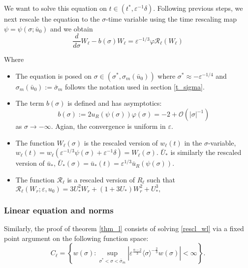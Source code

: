 \documentclass[letterpaper,11pt]{article}
\newcommand{\Ral}{\mathcal{R}}
\newcommand{\rmO}{\mathcal{O}}
\newcommand{\eps}{\varepsilon}
\numberwithin{equation}{section}
\theoremstyle{plain}
\begin{document}
We want to solve this equation on $t\in (t^*, \eps^{-1}\delta)$. 
Following previous steps, we next rescale the equation to the $\sigma$-time variable using the time rescaling map $\psi = \psi(\sigma; \bar{u}_0)$ and we obtain
\begin{equation}\label{rescl_wl}
\frac{d}{d\sigma} W_\ell - b(\sigma)W_\ell = \eps^{-1/3}\varphi \Ral_\ell(W_\ell)
\end{equation}

Where 

\begin{itemize}
\item The equation is posed on $\sigma \in (\sigma^*, \sigma_m(\bar{u}_0))$ where $\sigma^* \approx -\eps^{-1/4}$ and $\sigma_m(\bar{u}_0) := \bar{\sigma}_m$ follows the notation used in section \ref{t_sigma}.

\item The term $b(\sigma)$ is defined and has asymptotics:
\[
b(\sigma) := 2u_R(\psi(\sigma))\varphi(\sigma) = -2 + \rmO(|\sigma|^{-1})
\]
as $\sigma \to -\infty$. Agian, the convergence is uniform in $\eps$.

\item The function $W_\ell(\sigma)$ is the rescaled version of $w_\ell(t)$ in the $\sigma$-variable, $w_\ell(t) = w_\ell(\eps^{-1/3}\psi(\sigma)+\eps^{-1}\delta) = W_\ell(\sigma)$. $\bar{U}_*$ is similarly the rescaled version of $\bar{u}_*$,  $\bar{U}_*(\sigma)= \bar{u}_*(t) = \eps^{1/3}\bar{u}_R(\psi(\sigma ) )$.

\item The function $\Ral_\ell$ is a rescaled version of $R_\ell$ such that $\Ral_\ell(W_r;\eps,u_0) = 3U_*^2W_r + (1+3U_*)W_r^2 + U_*^3,$ 
\end{itemize}



\subsubsection{Linear equation and norms}

Similarly, the proof of theorem \ref{thm_l} consists of solving \eqref{rescl_wl} via a fixed point argument on the following function space:
\[
C_{\ell} = \left\{ w(\sigma) : \sup_{\sigma^*<\sigma<\bar{\sigma}_m} |\eps^{\frac{\alpha-2}{3}}\langle\sigma \rangle^{-\frac{2}{3}} w(\sigma)|<\infty \right\}.
\]

\end{document}
